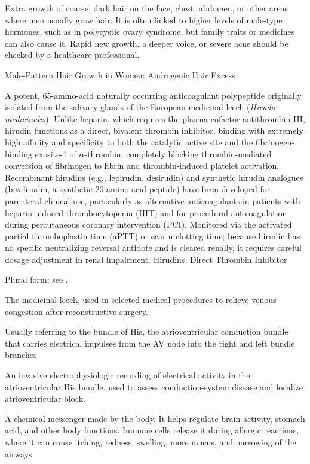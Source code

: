  Extra growth of coarse, dark hair on the face, chest, abdomen, or other areas where men usually grow hair. It is often linked to higher levels of male-type hormones, such as in polycystic ovary syndrome, but family traits or medicines can also cause it. Rapid new growth, a deeper voice, or severe acne should be checked by a healthcare professional.

\synonyms
Male-Pattern Hair Growth in Women; Androgenic Hair Excess

 A potent, 65-amino-acid naturally occurring anticoagulant polypeptide originally isolated from the salivary glands of the European medicinal leech (\textit{Hirudo medicinalis}). Unlike heparin, which requires the plasma cofactor antithrombin III, hirudin functions as a direct, bivalent thrombin inhibitor, binding with extremely high affinity and specificity to both the catalytic active site and the fibrinogen-binding exosite-1 of $\alpha$-thrombin, completely blocking thrombin-mediated conversion of fibrinogen to fibrin and thrombin-induced platelet activation. Recombinant hirudins (e.g., lepirudin, desirudin) and synthetic hirudin analogues (bivalirudin, a synthetic 20-amino-acid peptide) have been developed for parenteral clinical use, particularly as alternative anticoagulants in patients with heparin-induced thrombocytopenia (HIT) and for procedural anticoagulation during percutaneous coronary intervention (PCI). Monitored via the activated partial thromboplastin time (aPTT) or ecarin clotting time; because hirudin has no specific neutralizing reversal antidote and is cleared renally, it requires careful dosage adjustment in renal impairment.
\synonyms
Hirudins; Direct Thrombin Inhibitor

 Plural form; see .

 The medicinal leech, used in selected medical procedures to relieve venous congestion after reconstructive surgery.

 Usually referring to the bundle of His, the atrioventricular conduction bundle that carries electrical impulses from the AV node into the right and left bundle branches.

 An invasive electrophysiologic recording of electrical activity in the atrioventricular His bundle, used to assess conduction-system disease and localize atrioventricular block.

 A chemical messenger made by the body. It helps regulate brain
activity, stomach acid, and other body functions. Immune cells release it during
allergic reactions, where it can cause itching, redness, swelling, more mucus,
and narrowing of the airways.

